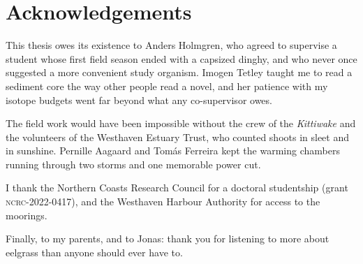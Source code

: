 \chapter*{Acknowledgements}

This thesis owes its existence to Anders Holmgren, who agreed to
supervise a student whose first field season ended with a capsized
dinghy, and who never once suggested a more convenient study organism.
Imogen Tetley taught me to read a sediment core the way other people read
a novel, and her patience with my isotope budgets went far beyond what
any co-supervisor owes.

The field work would have been impossible without the crew of the
\emph{Kittiwake} and the volunteers of the Westhaven Estuary Trust, who
counted shoots in sleet and in sunshine. Pernille Aagaard and Tomás
Ferreira kept the warming chambers running through two storms and one
memorable power cut.

I thank the Northern Coasts Research Council for a doctoral studentship
(grant \textsc{ncrc}-2022-0417), and the
Westhaven Harbour Authority for access to the moorings.

Finally, to my parents, and to Jonas: thank you for listening to more
about eelgrass than anyone should ever have to.

\cleardoublepage
